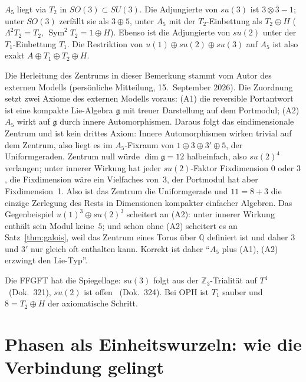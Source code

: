 \begin{theorem}
$A_5$ liegt via $T_2$ in $SO(3)\subset SU(3)$. Die Adjungierte von $su(3)$
ist $3\otimes\bar3-1$; unter $SO(3)$ zerfällt sie als $3\oplus5$, unter
$A_5$ mit der $T_2$-Einbettung als $T_2\oplus H$ ($\Lambda^2T_2=T_2$,
$\operatorname{Sym}^2T_2=1\oplus H$). Ebenso ist die Adjungierte von
$su(2)$ unter der $T_1$-Einbettung $T_1$. Die Restriktion von
$u(1)\oplus su(2)\oplus su(3)$ auf $A_5$ ist also exakt
$A\oplus T_1\oplus T_2\oplus H$.
\end{theorem}

\begin{remark}
Die Herleitung des Zentrums in dieser Bemerkung stammt vom Autor des
externen Modells (persönliche Mitteilung, 15.~September 2026).
Die Zuordnung setzt zwei Axiome des externen Modells voraus: (A1) die
reversible Portantwort ist eine kompakte Lie-Algebra $\mathfrak{g}$ mit
treuer Darstellung auf dem Portmodul; (A2) $A_5$ wirkt auf $\mathfrak{g}$
durch innere Automorphismen. Daraus folgt das eindimensionale Zentrum
und ist kein drittes Axiom: Innere Automorphismen wirken trivial auf dem
Zentrum, also liegt es im $A_5$-Fixraum von $1\oplus3\oplus3'\oplus5$, der
Uniformgeraden. Zentrum null würde $\dim\mathfrak{g}=12$ halbeinfach, also
$su(2)^4$ verlangen; unter innerer Wirkung hat jeder $su(2)$-Faktor
Fixdimension $0$ oder $3$, die Fixdimension wäre ein Vielfaches von~3,
der Portmodul hat aber Fixdimension~1. Also ist das Zentrum die
Uniformgerade und $11=8+3$ die einzige Zerlegung des Rests in
Dimensionen kompakter einfacher Algebren. Das Gegenbeispiel
$u(1)^3\oplus su(2)^3$ scheitert an (A2): unter innerer Wirkung enthält
sein Modul keine~$5$; und schon ohne (A2) scheitert es an
Satz~\ref{thm:galois}, weil das Zentrum eines Torus über $\mathbb{Q}$
definiert ist und daher $3$ und $3'$ nur gleich oft enthalten kann.
Korrekt ist daher \enquote{$A_5$ plus (A1), (A2) erzwingt den Lie-Typ}.
\end{remark}

Die FFGFT hat die Spiegellage: $su(3)$ folgt aus der $\mathbb{Z}_3$-Trialität
auf $T^4$ \BM\ (Dok.~321), $su(2)$ ist offen \SM\ (Dok.~324). Bei OPH ist
$T_1$ sauber und $8=T_2\oplus H$ der axiomatische Schritt.

\section{Phasen als Einheitswurzeln: wie die Verbindung gelingt}\label{sec:phasen}

